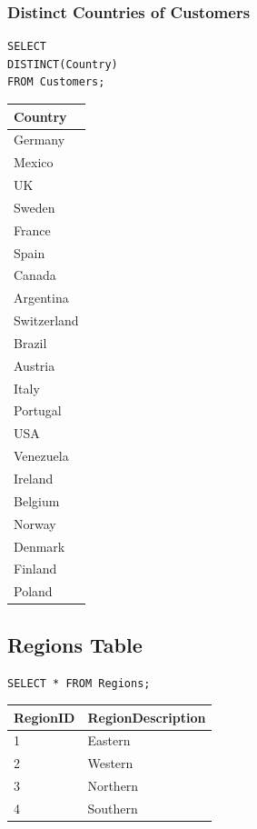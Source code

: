 \documentclass[10pt]{article}
\begin{document}
\subsubsection{Distinct Countries of Customers}

\begin{verbatim}
SELECT 
DISTINCT(Country)
FROM Customers;
\end{verbatim}

\begin{table}[H]
\begin{tabular}{|l|}
\hline
Country \\
\hline
Germany \\
Mexico \\
UK \\
Sweden \\
France \\
Spain \\
Canada \\
Argentina \\
Switzerland \\
Brazil \\
Austria \\
Italy \\
Portugal \\
USA \\
Venezuela \\
Ireland \\
Belgium \\
Norway \\
Denmark \\
Finland \\
Poland \\
\hline
\end{tabular}
\end{table}


\subsection{Regions Table}

\begin{verbatim}
SELECT * FROM Regions;
\end{verbatim}


\begin{table}[H]
\begin{tabular}{|l|l|}
\hline
RegionID	& RegionDescription \\
\hline
1	& Eastern \\
2	& Western \\
3	& Northern \\
4	& Southern \\
\hline
\end{tabular}
\end{table}
\end{document}
